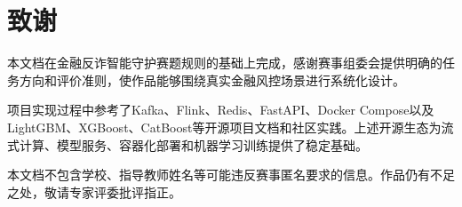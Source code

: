 \section*{\centering\heiti{}致\quad 谢}

{\songti{}
本文档在金融反诈智能守护赛题规则的基础上完成，感谢赛事组委会提供明确的任务方向和评价准则，使作品能够围绕真实金融风控场景进行系统化设计。

项目实现过程中参考了Kafka、Flink、Redis、FastAPI、Docker Compose以及LightGBM、XGBoost、CatBoost等开源项目文档和社区实践。上述开源生态为流式计算、模型服务、容器化部署和机器学习训练提供了稳定基础。

本文档不包含学校、指导教师姓名等可能违反赛事匿名要求的信息。作品仍有不足之处，敬请专家评委批评指正。
}
